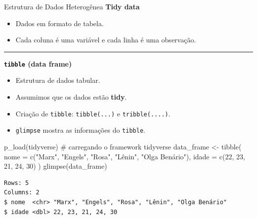 \documentclass[
  10pt,
  ignorenonframetext,
]{beamer}
\newenvironment{Shaded}{\begin{snugshade}}{\end{snugshade}}
\newcommand{\AttributeTok}[1]{\textcolor[rgb]{0.40,0.45,0.13}{#1}}
\newcommand{\CommentTok}[1]{\textcolor[rgb]{0.37,0.37,0.37}{#1}}
\newcommand{\DecValTok}[1]{\textcolor[rgb]{0.68,0.00,0.00}{#1}}
\newcommand{\FunctionTok}[1]{\textcolor[rgb]{0.28,0.35,0.67}{#1}}
\newcommand{\NormalTok}[1]{\textcolor[rgb]{0.00,0.23,0.31}{#1}}
\newcommand{\OtherTok}[1]{\textcolor[rgb]{0.00,0.23,0.31}{#1}}
\newcommand{\StringTok}[1]{\textcolor[rgb]{0.13,0.47,0.30}{#1}}
\providecommand{\tightlist}{%
  \setlength{\itemsep}{0pt}\setlength{\parskip}{0pt}}\usepackage{longtable,booktabs,array}
\newcommand*{\regrafina}{\rule{\textwidth}{0.5pt}}
\begin{document}
\begin{frame}[fragile]{Estrutura de Dados Heterogênea}
\protect\hypertarget{estrutura-de-dados-heteroguxeanea-1}{}
\textbf{Tidy data}

\begin{itemize}
\tightlist
\item
  Dados em formato de tabela.
\item
  Cada coluna é uma variável e cada linha é uma observação.
\end{itemize}

\regrafina

\textbf{\texttt{tibble} (data frame)}

\begin{itemize}
\tightlist
\item
  Estrutura de dados tabular.
\item
  Assumimos que os dados estão \textbf{tidy}.
\item
  Criação de \texttt{tibble}: \texttt{tibble(...)} e
  \texttt{tribble(....)}.
\item
  \texttt{glimpse} mostra as informações do \texttt{tibble}.
\end{itemize}
\end{frame}

\begin{frame}[fragile]
\begin{Shaded}
\begin{Highlighting}[]
\FunctionTok{p\_load}\NormalTok{(tidyverse) }\CommentTok{\# carregando o framework tidyverse}
\NormalTok{data\_frame }\OtherTok{\textless{}{-}} \FunctionTok{tibble}\NormalTok{(}
  \AttributeTok{nome =} \FunctionTok{c}\NormalTok{(}\StringTok{"Marx"}\NormalTok{, }\StringTok{"Engels"}\NormalTok{, }\StringTok{"Rosa"}\NormalTok{, }\StringTok{"Lênin"}\NormalTok{, }\StringTok{"Olga Benário"}\NormalTok{),}
  \AttributeTok{idade =} \FunctionTok{c}\NormalTok{(}\DecValTok{22}\NormalTok{, }\DecValTok{23}\NormalTok{, }\DecValTok{21}\NormalTok{, }\DecValTok{24}\NormalTok{, }\DecValTok{30}\NormalTok{)}
\NormalTok{)}
\FunctionTok{glimpse}\NormalTok{(data\_frame)}
\end{Highlighting}
\end{Shaded}

\begin{verbatim}
Rows: 5
Columns: 2
$ nome  <chr> "Marx", "Engels", "Rosa", "Lênin", "Olga Benário"
$ idade <dbl> 22, 23, 21, 24, 30
\end{verbatim}
\end{frame}
\end{document}
